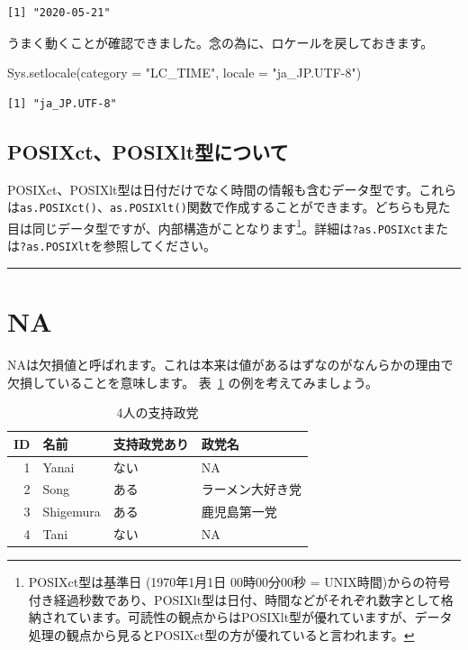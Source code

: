 \documentclass[
  a4paper,
  pandoc,
  ja=standard,
  jafont=haranoaji]{bxjsbook}
\newenvironment{Shaded}{\begin{snugshade}}{\end{snugshade}}
\newcommand{\AttributeTok}[1]{\textcolor[rgb]{0.00,0.48,0.65}{#1}}
\newcommand{\FunctionTok}[1]{\textcolor[rgb]{0.28,0.35,0.67}{#1}}
\newcommand{\NormalTok}[1]{\textcolor[rgb]{0.00,0.48,0.65}{#1}}
\newcommand{\StringTok}[1]{\textcolor[rgb]{0.13,0.47,0.30}{#1}}
\begin{document}
\begin{verbatim}
[1] "2020-05-21"
\end{verbatim}

うまく動くことが確認できました。念の為に、ロケールを戻しておきます。

\begin{Shaded}
\begin{Highlighting}[numbers=left,,]
\FunctionTok{Sys.setlocale}\NormalTok{(}\AttributeTok{category =} \StringTok{"LC\_TIME"}\NormalTok{, }\AttributeTok{locale =} \StringTok{"ja\_JP.UTF{-}8"}\NormalTok{)}
\end{Highlighting}
\end{Shaded}

\begin{verbatim}
[1] "ja_JP.UTF-8"
\end{verbatim}

\hypertarget{posixctposixltux578bux306bux3064ux3044ux3066}{%
\subsection{POSIXct、POSIXlt型について}\label{posixctposixltux578bux306bux3064ux3044ux3066}}

POSIXct、POSIXlt型は日付だけでなく時間の情報も含むデータ型です。これらは\texttt{as.POSIXct()}、\texttt{as.POSIXlt()}関数で作成することができます。どちらも見た目は同じデータ型ですが、内部構造がことなります\footnote{POSIXct型は基準日
  (1970年1月1日 00時00分00秒 =
  UNIX時間)からの符号付き経過秒数であり、POSIXlt型は日付、時間などがそれぞれ数字として格納されています。可読性の観点からはPOSIXlt型が優れていますが、データ処理の観点から見るとPOSIXct型の方が優れていると言われます。}。詳細は\texttt{?as.POSIXct}または\texttt{?as.POSIXlt}を参照してください。

\begin{center}\rule{0.5\linewidth}{0.5pt}\end{center}

\hypertarget{sec-type_na}{%
\section{NA}\label{sec-type_na}}

NAは欠損値と呼ばれます。これは本来は値があるはずなのがなんらかの理由で欠損していることを意味します。
表~\ref{tbl-na_example1} の例を考えてみましょう。

\hypertarget{tbl-na_example1}{}
\begin{table}
\caption{\label{tbl-na_example1}4人の支持政党 }

\centering
\begin{tabular}{r|l|l|l}
\hline
ID & 名前 & 支持政党あり & 政党名\\
\hline
1 & Yanai & ない & NA\\
\hline
2 & Song & ある & ラーメン大好き党\\
\hline
3 & Shigemura & ある & 鹿児島第一党\\
\hline
4 & Tani & ない & NA\\
\hline
\end{tabular}
\end{table}
\end{document}
